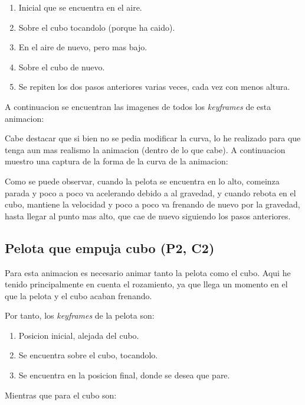 \documentclass{article}
\begin{document}
\begin{enumerate}
    \item Inicial que se encuentra en el aire.
    \item Sobre el cubo tocandolo (porque ha caido).
    \item En el aire de nuevo, pero mas bajo.
    \item Sobre el cubo de nuevo.
    \item Se repiten los dos pasos anteriores varias veces, cada vez con menos altura.
\end{enumerate}

A continuacion se encuentran las imagenes de todos los \textit{keyframes} de esta animacion:



Cabe destacar que si bien no se pedia modificar la curva, lo he realizado para que tenga aun mas realismo la animacion (dentro de lo que cabe). A continuacion muestro una captura de la forma de la curva de la animacion:



Como se puede observar, cuando la pelota se encuentra en lo alto, comeinza parada y poco a poco va acelerando debido a al gravedad, y cuando rebota en el cubo, mantiene la velocidad y poco a poco va frenando de nuevo por la gravedad, hasta llegar al punto mas alto, que cae de nuevo siguiendo los pasos anteriores.

\subsection{Pelota que empuja cubo (P2, C2)}

Para esta animacion es necesario animar tanto la pelota como el cubo. Aqui he tenido principalmente en cuenta el rozamiento, ya que llega un momento en el que la pelota y el cubo acaban frenando.

\bigskip

Por tanto, los \textit{keyframes} de la pelota son:

\begin{enumerate}
    \item Posicion inicial, alejada del cubo.
    \item Se encuentra sobre el cubo, tocandolo.
    \item Se encuentra en la posicion final, donde se desea que pare.
\end{enumerate}

Mientras que para el cubo son:
\end{document}
